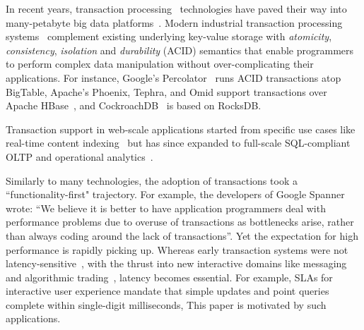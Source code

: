 In recent years, transaction processing~\cite{Gray:1992:TPC:573304} technologies have paved their way into many-petabyte big data 
platforms~\cite{Percolator2010,Spanner2012,Omid2017}. 
Modern industrial transaction processing systems~\cite{Percolator2010,Omid2017,tephra,cockroach} complement 
existing underlying key-value storage with {\em atomicity}, {\em consistency}, {\em isolation\/} and 
{\em durability} (ACID) semantics that enable programmers to perform 
complex data manipulation without over-complicating their applications. 
For instance, Google's Percolator~\cite{Percolator2010} runs ACID transactions atop BigTable, 
Apache's Phoenix, Tephra, and Omid support transactions over Apache HBase~\cite{hbase}, and CockroachDB~\cite{cockroach} is based on RocksDB. 

Transaction support in web-scale applications started from specific use cases like real-time content indexing~\cite{Percolator2010,
Omid2017} but has since expanded to full-scale SQL-compliant OLTP and operational analytics~\cite{Phoenix, F1-2013}.


Similarly to many technologies, the adoption of transactions took a  ``functionality-first" trajectory. 
For example, the developers of Google Spanner~\cite{Spanner2012} wrote: ``We believe it
is better to have application programmers deal with performance problems due to overuse 
of transactions as bottlenecks arise, rather than always coding around the lack of transactions''. 
Yet the expectation for high performance is rapidly picking up. 
Whereas early transaction systems were not latency-sensitive~\cite{Percolator2010, Omid2017}, 
with the thrust into new interactive domains like messaging~\cite{Borthakur:2011} and algorithmic 
trading~\cite{opentsdb}, latency becomes essential.  For example,  SLAs for interactive user experience
mandate that simple updates and point queries  complete within single-digit milliseconds, 
This paper is motivated by such  applications.

